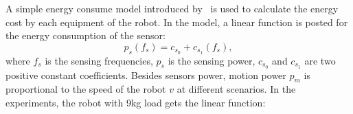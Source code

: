 \documentclass[journal]{IEEEtran}
\begin{document}
%
%


%



A simple energy consume model introduced by~\cite{Mei} is used to calculate the energy cost by each equipment of the robot. In the model, a linear function is posted for the energy consumption of the sensor:
%
\begin{equation}
p_s(f_s) = c_{s_0} + c_{s_1}(f_s),
\label{eq:07}
\end{equation}
%
where $f_s$ is the sensing frequencies, $p_s$ is the sensing power, $c_{s_0}$ and $c_{s_1}$ are two positive constant coefficients. Besides sensors power, motion power $p_m$ is proportional to the speed of the robot $v$ at different scenarios. In the experiments, the robot with 9kg load gets the linear function:
\end{document}
